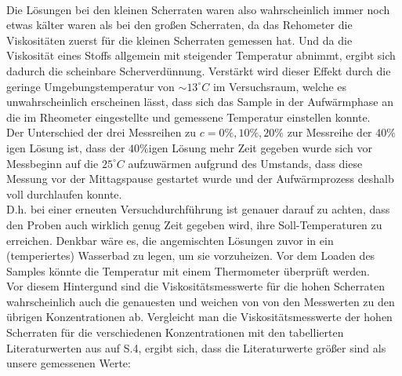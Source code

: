 \documentclass[11pt,a4paper,oneside]{scrartcl}
\begin{document}
\\ Die Lösungen bei den kleinen Scherraten waren also wahrscheinlich immer noch etwas kälter waren als
bei den großen Scherraten, da das Rehometer die Viskositäten zuerst für die kleinen Scherraten gemessen hat.  Und da die Viskosität eines Stoffs allgemein mit steigender Temperatur abnimmt, ergibt sich dadurch die scheinbare Scherverdünnung. Verstärkt wird dieser Effekt durch die geringe Umgebungstemperatur von $\sim 13^\circ C$ im Versuchsraum, welche es unwahrscheinlich erscheinen lässt, dass sich das Sample in der Aufwärmphase an die im Rheometer eingestellte und gemessene Temperatur einstellen konnte.\\
Der Unterschied der drei Messreihen zu $c=0\%,10\%,20\%$ zur Messreihe
der $40\%$igen Lösung ist, dass der $40\%$igen Lösung mehr Zeit gegeben wurde sich vor Messbeginn auf die $25^{\circ}C$ aufzuwärmen aufgrund des Umstands, dass diese Messung vor der Mittagspause gestartet wurde und der Aufwärmprozess deshalb voll durchlaufen konnte. \\
D.h. bei einer erneuten Versuchdurchführung
ist genauer darauf zu achten, dass den Proben auch wirklich genug Zeit gegeben wird, ihre Soll-Temperaturen zu erreichen. Denkbar wäre es, die angemischten Lösungen zuvor in ein (temperiertes) Wasserbad zu legen, um sie vorzuheizen. Vor dem Loaden des Samples könnte die Temperatur mit einem Thermometer überprüft werden.\\
Vor diesem Hintergund sind die Viskositätsmesswerte für die hohen Scherraten wahrscheinlich auch die genauesten und weichen von  von den Messwerten zu den übrigen Konzentrationen ab. Vergleicht man die Viskositätsmesswerte der hohen Scherraten für die verschiedenen
Konzentrationen mit den tabellierten Literaturwerten aus \cite{visaq} auf S.4, ergibt sich, dass die Literaturwerte größer sind als unsere gemessenen Werte:
\end{document}
